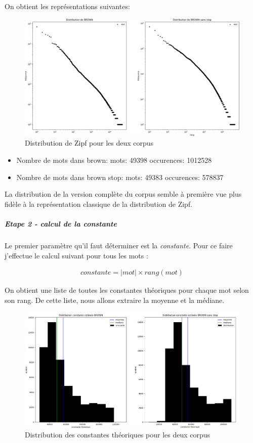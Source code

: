 \documentclass[a4paper,12pt]{article}
\begin{document}
    		
    		On obtient les représentations suivantes: 
		\begin{figure}[H]
				\includegraphics[width=\linewidth]{img/distribZipf.png}
				\caption{Distribution de Zipf pour les deux corpus}
		\end{figure}    		
    		
    		\begin{itemize}
    			\item Nombre de mots dans brown:	mots: 49398	occurences: 1012528
    			\item Nombre de mots dans brown stop:	mots: 49383	occurences: 578837\\
    		\end{itemize}
    		
    		La distribution de la version complète du corpus semble à première vue plus fidèle à la représentation classique de la distribution de Zipf. 
			
		\subparagraph{Etape 2 - calcul de la constante}
			Le premier paramètre qu'il faut déterminer est la \emph{constante}. Pour ce faire j'effectue le calcul suivant pour tous les mots :
			
			\begin{align*}
				constante = |mot| \times rang(mot)
			\end{align*}
			
			On obtient une liste de toutes les constantes théoriques pour chaque mot selon son rang.
			De cette liste, nous allons extraire la moyenne et la médiane.
			
			\begin{figure}[H]
				\includegraphics[width=\linewidth]{img/distribContTh.png}
				\caption{Distribution des constantes théoriques pour les deux corpus}
			\end{figure}
			
\end{document}
